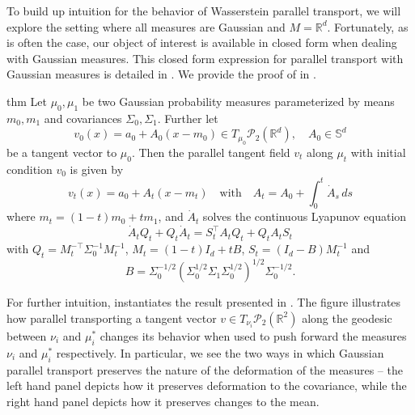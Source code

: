 \documentclass[11pt]{article}
\newcommand{\man}{M}
\begin{document}
To build up intuition for the behavior of Wasserstein parallel transport, we will explore the setting where all measures are Gaussian and $\man = \mathbb{R}^d$. Fortunately, as is often the case, our object of interest is available in closed form when dealing with Gaussian measures. This closed form expression for parallel transport with Gaussian measures is detailed in . We provide the proof of  in .

\begin{restatable}{thm}{} \label{Gaussian parallel transport}
    Let $\mu_0, \mu_1$ be two Gaussian probability measures parameterized by means $m_0, m_1$ and covariances $\Sigma_0, \Sigma_1$. Further let 
    \[v_0(x) = a_0 + A_0(x - m_0) \in T_{\mu_0}\mathcal{P}_2(\mathbb{R}^d), \quad A_0 \in \mathbb{S}^d\]
    be a tangent vector to $\mu_0$. Then the parallel tangent field $v_t$ along $\mu_t$ with initial condition $v_0$ is given by
    \[v_t(x) = a_0 + A_t(x - m_t) \quad \text{with} \quad A_t = A_0 + \int_0^t \dot A_s\, ds\]
    where $m_t = (1-t)m_0 + tm_1$, and $\dot A_t$ solves the continuous Lyapunov equation
    \[\dot A_tQ_t + Q_t \dot A_t = S^{\top}_tA_tQ_t + Q_tA_tS_t\]
    with $Q_t = M_t^{-\top}\Sigma_0^{-1}M_t^{-1}$, $M_t = (1-t)I_d + tB$, $S_t = (I_d - B)M_t^{-1}$ and 
    \[B = \Sigma_0^{-1/2}\left(\Sigma_0^{1/2}\Sigma_1\Sigma_0^{1/2}\right)^{1/2}\Sigma_0^{-1/2}.\]
\end{restatable}

For further intuition,  instantiates the result presented in . The figure illustrates how parallel transporting a tangent vector $v \in T_{\nu_i}\mathcal{P}_2(\mathbb{R}^2)$ along the geodesic between $\nu_i$ and $\mu_i^*$ changes its behavior when used to push forward the measures $\nu_i$ and $\mu_i^*$ respectively. In particular, we see the two ways in which Gaussian parallel transport preserves the nature of the deformation of the measures -- the left hand panel depicts how it preserves deformation to the covariance, while the right hand panel depicts how it preserves changes to the mean. 
\end{document}
